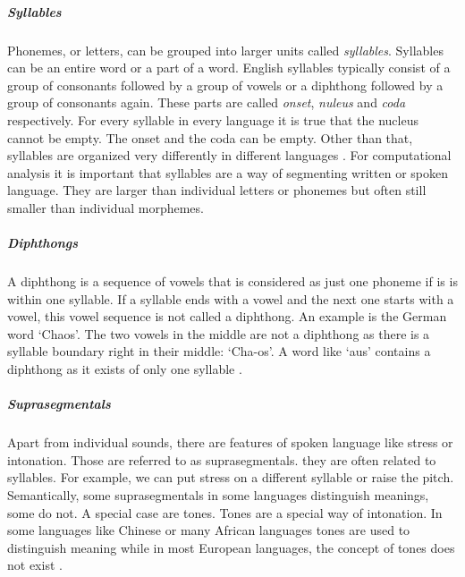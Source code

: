 \subparagraph{Syllables} Phonemes, or letters, can be grouped into larger units called \textit{syllables}. Syllables can be an entire word or a part of a word. English syllables typically consist of a group of consonants followed by a group of vowels or a diphthong followed by a group of consonants again. These parts are called \textit{onset}, \textit{nuleus} and \textit{coda} respectively.  For every syllable in every language it is true that the nucleus cannot be empty. The onset and the coda can be empty. Other than that, syllables are organized very differently in different languages \citep{Intro.2007}. For computational analysis it is important that syllables are a way of segmenting written or spoken language. They are larger than individual letters or phonemes but often still smaller than individual morphemes. 

\subparagraph{Diphthongs}
A diphthong is a sequence of vowels that is considered as just one phoneme if is is within one syllable. If a syllable ends with a vowel and the next one starts with a vowel, this vowel sequence is not called a diphthong. An example is the German word `Chaos'. The two vowels in the middle are not a diphthong as there is a syllable boundary right in their middle: `Cha-os'. A word like `aus' contains a diphthong as it exists of only one syllable \citep{Intro.2007}. 

\subparagraph{Suprasegmentals} Apart from individual sounds, there are features of spoken language like stress or intonation. Those are referred to as suprasegmentals. they are often related to syllables. For example, we can put stress on a different syllable or raise the pitch. Semantically, some suprasegmentals in some languages distinguish meanings, some do not. A special case are tones. Tones are a special way of intonation. In some languages like Chinese or many African languages tones are used to distinguish meaning while in most European languages, the concept of tones does not exist \citep{Intro.2007}.


